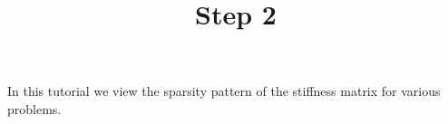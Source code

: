 \documentclass{../notes}
\title{Step 2}
\begin{document}
\maketitle

In this tutorial we view the sparsity pattern of the stiffness matrix for various
problems.
\end{document}
